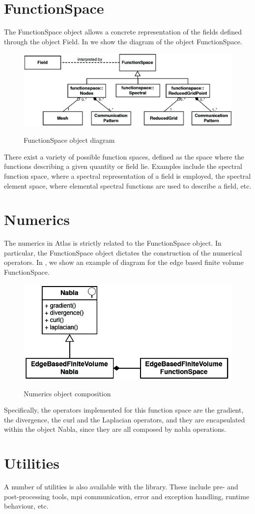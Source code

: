 \section{FunctionSpace}
The FunctionSpace object allows a concrete representation 
of the fields defined through the object Field. In 
 we show the diagram of the 
object FunctionSpace.
%
\begin{figure}
\centering
\includegraphics[scale=0.25]{imgs/functionspace.png}
\label{fig:functionspace}
\caption{FunctionSpace object diagram}
\end{figure}
%
There exist a variety of possible function spaces, defined 
as the space where the functions describing a given quantity 
or field lie. Examples include the spectral function space,
where a spectral representation of a field is employed, 
the spectral element space, where elemental spectral 
functions are used to describe a field, etc.



\section{Numerics}
The numerics in Atlas is strictly related to the FunctionSpace 
object. In particular, the FunctionSpace object dictates the 
construction of the numerical operators.
In , we show an example of diagram for the 
edge based finite volume FunctionSpace.
%
\begin{figure}
\centering
\includegraphics[scale=0.25]{imgs/numerics.png}
\label{fig:numerics}
\caption{Numerics object composition}
\end{figure}
%
Specifically, the operators implemented for this function space 
are the gradient, the divergence, the curl and the Laplacian 
operators, and they are encapsulated within the object Nabla, 
since they are all composed by nabla operations.



\section{Utilities}
A number of utilities is also available with the library. These include 
pre- and post-processing tools, mpi communication, error and exception 
handling, runtime behaviour, etc.

